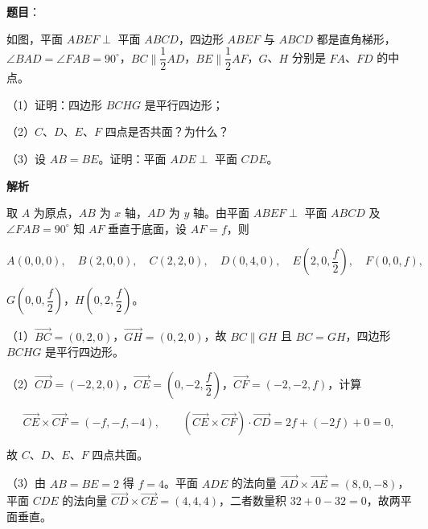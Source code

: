 \begin{answer}

\textbf{题目}：

如图，平面 $ABEF\perp$ 平面 $ABCD$，四边形 $ABEF$ 与 $ABCD$ 都是直角梯形，$\angle BAD=\angle FAB=90^\circ$，$BC\parallel\dfrac12AD$，$BE\parallel\dfrac12AF$，$G$、$H$ 分别是 $FA$、$FD$ 的中点。

（1）证明：四边形 $BCHG$ 是平行四边形；

（2）$C$、$D$、$E$、$F$ 四点是否共面？为什么？

（3）设 $AB=BE$。证明：平面 $ADE\perp$ 平面 $CDE$。
\nopagebreak[4]
\begin{center}\end{center}
\nopagebreak[4]
\textbf{解析}

取 $A$ 为原点，$AB$ 为 $x$ 轴，$AD$ 为 $y$ 轴。由平面 $ABEF\perp$ 平面 $ABCD$ 及 $\angle FAB=90^\circ$ 知 $AF$ 垂直于底面，设 $AF=f$，则

\nopagebreak[4]
\[A(0,0,0),\quad B(2,0,0),\quad C(2,2,0),\quad D(0,4,0),\quad E\left(2,0,\frac f2\right),\quad F(0,0,f),\]

$G\left(0,0,\dfrac f2\right)$，$H\left(0,2,\dfrac f2\right)$。

（1）$\overrightarrow{BC}=(0,2,0)$，$\overrightarrow{GH}=(0,2,0)$，故 $BC\parallel GH$ 且 $BC=GH$，四边形 $BCHG$ 是平行四边形。

（2）$\overrightarrow{CD}=(-2,2,0)$，$\overrightarrow{CE}=\left(0,-2,\dfrac f2\right)$，$\overrightarrow{CF}=(-2,-2,f)$，计算

\nopagebreak[4]
\[\overrightarrow{CE}\times\overrightarrow{CF}=(-f,-f,-4),\qquad (\overrightarrow{CE}\times\overrightarrow{CF})\cdot\overrightarrow{CD}=2f+(-2f)+0=0,\]

故 $C$、$D$、$E$、$F$ 四点共面。

（3）由 $AB=BE=2$ 得 $f=4$。平面 $ADE$ 的法向量 $\overrightarrow{AD}\times\overrightarrow{AE}=(8,0,-8)$，平面 $CDE$ 的法向量 $\overrightarrow{CD}\times\overrightarrow{CE}=(4,4,4)$，二者数量积 $32+0-32=0$，故两平面垂直。


\end{answer}
